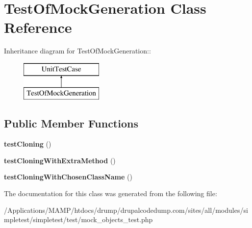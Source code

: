 \hypertarget{class_test_of_mock_generation}{
\section{TestOfMockGeneration Class Reference}
\label{class_test_of_mock_generation}
}
Inheritance diagram for TestOfMockGeneration::\begin{figure}[H]
\begin{center}
\leavevmode
\includegraphics[height=2cm]{class_test_of_mock_generation}
\end{center}
\end{figure}
\subsection*{Public Member Functions}
\begin{DoxyCompactItemize}
\item 
\hypertarget{class_test_of_mock_generation_a2814628306c089113ca115af5707a4de}{
{\bfseries testCloning} ()}
\label{class_test_of_mock_generation_a2814628306c089113ca115af5707a4de}

\item 
\hypertarget{class_test_of_mock_generation_afcf7da4e175ac78d22e502c6b4b6d918}{
{\bfseries testCloningWithExtraMethod} ()}
\label{class_test_of_mock_generation_afcf7da4e175ac78d22e502c6b4b6d918}

\item 
\hypertarget{class_test_of_mock_generation_a43dd7d5d184ea90d93ab696b345d4502}{
{\bfseries testCloningWithChosenClassName} ()}
\label{class_test_of_mock_generation_a43dd7d5d184ea90d93ab696b345d4502}

\end{DoxyCompactItemize}


The documentation for this class was generated from the following file:\begin{DoxyCompactItemize}
\item 
/Applications/MAMP/htdocs/drump/drupalcodedump.com/sites/all/modules/simpletest/simpletest/test/mock\_\-objects\_\-test.php\end{DoxyCompactItemize}

